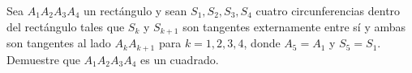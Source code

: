 Sea $A_1A_2A_3A_4$ un rectángulo y sean $S_1, S_2, S_3, S_4$ cuatro circunferencias dentro del rectángulo tales que $S_k$ y $S_{k+1}$ son tangentes externamente entre sí y ambas son tangentes al lado $A_kA_{k+1}$ para $k = 1,2,3,4$, donde $A_5 = A_1$ y $S_5 = S_1$. Demuestre que $A_1A_2A_3A_4$ es un cuadrado.